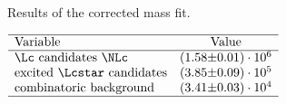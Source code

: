  
\begin{table}[h]
    \centering
    \caption{Results of the \Lc corrected mass fit.}
    \label{tab:fit_correctedMass}
    $\begin{array}{lr@{\pm}l}
    \hline
    \text{Variable} & \multicolumn{2}{c}{\text{Value}} \\
    \hline
        \text{\Lc candidates \NLc}&(1.58 & 0.01) \cdot 10^{6}\\
\text{excited \Lcstar candidates}&(3.85 & 0.09) \cdot 10^{5}\\
\text{combinatoric background}&(3.41 & 0.03) \cdot 10^{4}\\

\hline
\end{array}$
\end{table}
    
